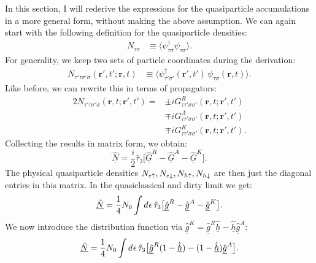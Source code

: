 In this section, I will rederive the expressions for the quasiparticle accumulations in a more general form, without making the above assumption.
We can again start with the following definition for the quasiparticle densities:
\begin{align}
  N_{\tau\sigma} &\equiv \big\langle \psi_{\tau\sigma}^\dagger \psi_{\tau\sigma}^{\phantom{\dagger}} \big\rangle.
\end{align}
For generality, we keep two sets of particle coordinates during the derivation:
\begin{align}
  N_{\tau'\tau\sigma'\sigma}(\bm{r}',t'; \bm{r},t) &\equiv \big\langle \psi_{\tau'\sigma'}^\dagger(\bm{r}',t')\, \psi_{\tau\sigma}^{\phantom{\dagger}}(\bm{r},t) \big\rangle.
\end{align}
Like before, we can rewrite this in terms of propagators:
\begin{equation}
\begin{aligned}
  2N_{\tau'\tau\sigma'\sigma}(\bm{r}, t; \bm{r}', t')
   =& \pm i G^R_{\tau\tau'\sigma\sigma'}(\bm{r}, t; \bm{r}', t') \\
    & \mp i G^A_{\tau\tau'\sigma\sigma'}(\bm{r}, t; \bm{r}', t') \\
    & \mp i G^K_{\tau\tau'\sigma\sigma'}(\bm{r}, t; \bm{r}', t') .
\end{aligned}
\end{equation}
Collecting the results in matrix form, we obtain:
\begin{equation}
  \underline{\hat{N}} = \frac{i}{2} \hat{\tau}_3 \big[\underline{\hat{G}}^R - \underline{\hat{G}}^A - \underline{\hat{G}}^K \big].
\end{equation}
The physical quasiparticle densities $N_{e\uparrow}, N_{e\downarrow}, N_{h\uparrow}, N_{h\downarrow}$ are then just the diagonal entries in this matrix.
In the quasiclassical and dirty limit we get:
\begin{equation}
  \underline{\hat{N}} = \frac{1}{4} N_0 \int d^{}\epsilon \, \hat{\tau}_3 \big[\underline{\hat{g}}^R - \underline{\hat{g}}^A - \underline{\hat{g}}^K \big].
\end{equation}
We now introduce the distribution function via $\underline{\hat{g}}^K = \underline{\hat{g}}^R \underline{\hat{h}} - \underline{\hat{h}} \underline{\hat{g}}^A$:
\begin{equation}
  \underline{\hat{N}} = \frac{1}{4} N_0 \int d^{}\epsilon \, \hat{\tau}_3 \big[\underline{\hat{g}}^R (1-\underline{\hat{h}}) - (1-\underline{\hat{h}}) \underline{\hat{g}}^A \big].
\end{equation}
